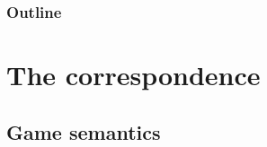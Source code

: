 \begin{frame}
  \frametitle{Outline}
  \tableofcontents
\end{frame}



\section{The correspondence}

\subsection{Game semantics}

%
%

